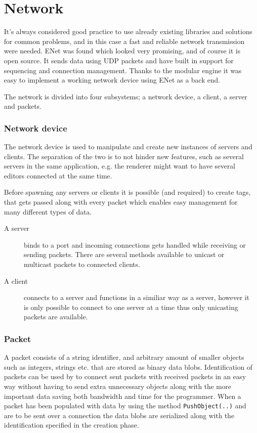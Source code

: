 \chapter{Network}
It's always considered good practice to use already existing libraries and solutions for common problems, and in this case a fast and reliable network transmission were needed.
ENet was found which looked very promising, and of course it is open source. It sends data using UDP packets and have built in support for sequencing and connection management. 
Thanks to the modular engine it was easy to implement a working network device using ENet as a back end.

The network is divided into four subsystems; a network device, a client, a server and packets.

\subsection{Network device}
The network device is used to manipulate and create new instances of servers and clients. The separation of the two is to not hinder new features, such as several servers in the same application, e.g. the renderer might want to have several editors connected at the same time.

Before spawning any servers or clients it is possible (and required) to create tags, that gets passed along with every packet which enables easy management for many different types of data.

\begin{description}
	\item[A server] binds to a port and incoming connections gets handled while receiving or sending packets. There are several methods available to unicast or multicast packets to connected clients.
	\item[A client] connects to a server and functions in a similiar way as a server, however it is only possible to connect to one server at a time thus only unicasting packets are available.
\end{description}

\subsection{Packet}
A packet consists of a string identifier, and arbitrary amount of smaller objects such as integers, strings etc. that are stored as binary data blobs.
Identification of packets can be used by to connect sent packets with received packets in an easy way without having to send extra unnecessary objects along with the more important data saving both bandwidth and time for the programmer.
When a packet has been populated with data by using the method \texttt{PushObject(..)} and are to be sent over a connection the data blobs are serialized along with the identification specified in the creation phase.


